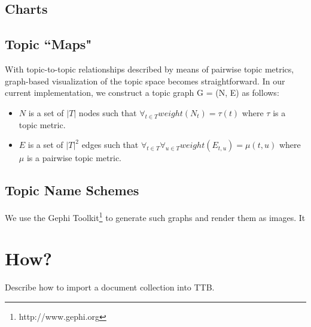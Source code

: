 \documentclass[a4paper,10pt]{article}
\begin{document}
\subsection{Charts}

\subsection{Topic ``Maps"}
With topic-to-topic relationships described by means of pairwise topic metrics, graph-based visualization of the topic space becomes straightforward. In our current implementation, we construct a topic graph G = (N, E) as follows:
\begin{itemize}
\item $N$ is a set of $|T|$ nodes such that $\forall_{t\in T} weight(N_{t}) = \tau(t)$ where $\tau$ is a topic metric.
\item $E$ is a set of $|T|^2$ edges such that $\forall_{t\in T}\forall_{u\in T} weight(E_{t,u}) = \mu(t,u)$ where $\mu$ is a pairwise topic metric.
\end{itemize}

\subsection{Topic Name Schemes}


We use the Gephi Toolkit\footnote{http://www.gephi.org} to generate such graphs and render them as images. It 



\section{How?}
Describe how to import a document collection into TTB.
\end{document}
